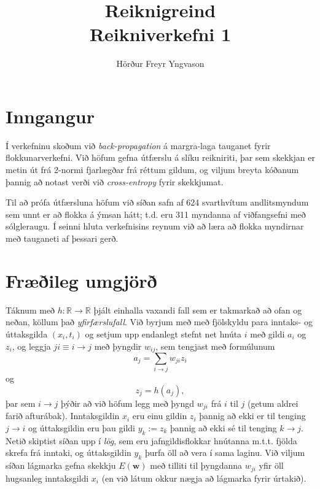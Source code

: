 \documentclass[a4paper,icelandic]{article}
\title{\textbf{Reiknigreind}\\Reikniverkefni 1}
\author{Hörður Freyr Yngvason}
\date{}
\begin{document}
\maketitle


\section{Inngangur}

Í verkefninu skoðum við \emph{back-propagation} á margra-laga tauganet
fyrir flokkunarverkefni. Við höfum gefna útfærslu á slíku reikniriti,
þar sem skekkjan er metin út frá 2-normi fjarlægðar frá réttum gildum, og
viljum breyta kóðanum þannig að notast verði við \emph{cross-entropy}
fyrir skekkjumat.

Til að prófa útfærsluna höfum við síðan safn af 624 svarthvítum
andlitsmyndum \cite{faces} sem unnt er að flokka á ýmsan hátt; t.d. eru 311 myndanna
af viðfangsefni með sólgleraugu. Í seinni hluta verkefnisins reynum
við að læra að flokka myndirnar með tauganeti af þessari gerð.


\section{Fræðileg umgjörð}

Táknum með $h:\mathbb R\to\mathbb R$ þjált einhalla vaxandi fall sem er
takmarkað að ofan og neðan, köllum það \emph{yfirfærslufall}.  Við
byrjum með með fjölskyldu para inntaks- og úttaksgilda $(x_i,t_i)$ og
setjum upp endanlegt stefnt net hnúta $i$ með gildi $a_i$ og $z_i$, og
leggja $ji \equiv i\to j$ með þyngdir $w_{ij}$, sem tengjast með formúlunum
\[
a_j = \sum_{i\to j} w_{ji} z_i
\]
og
\[
z_j = h(a_j),
\]
þar sem $i\to j$ þýðir að við höfum legg með þyngd $w_{ji}$ frá $i$ til
$j$ (getum aldrei farið afturábak). Inntaksgildin $x_i$ eru einu gildin
$z_i$ þannig að ekki er til tenging $j\to i$ og úttaksgildin eru þau
gildi $y_k:=z_k$ þannig að ekki sé til tenging $k\to j$. Netið skiptist
síðan upp í \emph{lög}, sem eru jafngildisflokkar hnútanna m.t.t. fjölda
skrefa frá inntaki, og úttaksgildin $y_k$ þurfa öll að vera í sama
laginu. Við viljum síðan lágmarka gefna skekkju $E(\mathbf w)$ með
tilliti til þyngdanna $w_{ji}$ yfir öll hugsanleg inntaksgildi $x_i$ (en
við látum okkur nægja að lágmarka fyrir úrtakið). 
\end{document}
